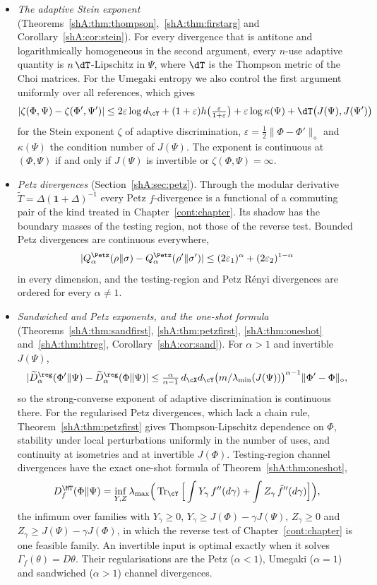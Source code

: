 \begin{itemize}[leftmargin=1.5em]
\item \emph{The adaptive Stein exponent} (Theorems~\ref{shA:thm:thompson},~\ref{shA:thm:firstarg} and Corollary~\ref{shA:cor:stein}). For every divergence that is antitone and logarithmically homogeneous in the second argument, every $n$-use adaptive quantity is $n\,\dT$-Lipschitz in $\Psi$, where $\dT$ is the Thompson metric of the Choi matrices. For the Umegaki entropy we also control the first argument uniformly over all references, which gives
\[
|\zeta(\Phi,\Psi)-\zeta(\Phi',\Psi')|\le 2\varepsilon\log d_\cY+(1+\varepsilon)h\big(\tfrac{\varepsilon}{1+\varepsilon}\big)+\varepsilon\log\kappa(\Psi)+\dT\big(J(\Psi),J(\Psi')\big)
\]
for the Stein exponent $\zeta$ of adaptive discrimination, $\varepsilon=\frac12\|\Phi-\Phi'\|_\diamond$ and $\kappa(\Psi)$ the condition number of $J(\Psi)$. The exponent is continuous at $(\Phi,\Psi)$ if and only if $J(\Psi)$ is invertible or $\zeta(\Phi,\Psi)=\infty$.
\item \emph{Petz divergences} (Section~\ref{shA:sec:petz}). Through the modular derivative $\widetilde T=\Delta(\mathbf 1+\Delta)^{-1}$ every Petz $f$-divergence is a functional of a commuting pair of the kind treated in Chapter~\ref{cont:chapter}. Its shadow has the boundary masses of the testing region, not those of the reverse test. Bounded Petz divergences are continuous everywhere,
\[
|Q^\Petz_\alpha(\rho\|\sigma)-Q^\Petz_\alpha(\rho'\|\sigma')|\le(2\varepsilon_1)^\alpha+(2\varepsilon_2)^{1-\alpha}
\]
in every dimension, and the testing-region and Petz R\'enyi divergences are ordered for every $\alpha\ne1$.
\item \emph{Sandwiched and Petz exponents, and the one-shot formula} (Theorems~\ref{shA:thm:sandfirst}, \ref{shA:thm:petzfirst}, \ref{shA:thm:oneshot} and~\ref{shA:thm:htreg}, Corollary~\ref{shA:cor:sand}). For $\alpha>1$ and invertible $J(\Psi)$,
\[
|\widetilde D^\reg_\alpha(\Phi'\|\Psi)-\widetilde D^\reg_\alpha(\Phi\|\Psi)|\le\tfrac{\alpha}{\alpha-1}\,d_\cX d_\cY\big(m/\lambda_{\min}(J(\Psi))\big)^{\alpha-1}\|\Phi'-\Phi\|_\diamond ,
\]
so the strong-converse exponent of adaptive discrimination is continuous there. For the regularised Petz divergences, which lack a chain rule, Theorem~\ref{shA:thm:petzfirst} gives Thompson-Lipschitz dependence on $\Phi$, stability under local perturbations uniformly in the number of uses, and continuity at isometries and at invertible $J(\Phi)$. Testing-region channel divergences have the exact one-shot formula of Theorem~\ref{shA:thm:oneshot},
\[
D^\HT_f(\Phi\|\Psi)=\inf_{Y,Z}\lambda_{\max}\Big(\Tr_\cY\Big[\int Y_\gamma\,f''(d\gamma)+\int Z_\gamma\,\tilde f''(d\gamma)\Big]\Big),
\]
the infimum over families with $Y_\gamma\ge0$, $Y_\gamma\ge J(\Phi)-\gamma J(\Psi)$, $Z_\gamma\ge0$ and $Z_\gamma\ge J(\Psi)-\gamma J(\Phi)$, in which the reverse test of Chapter~\ref{cont:chapter} is one feasible family. An invertible input is optimal exactly when it solves $\Gamma_f(\theta)=D\theta$. Their regularisations are the Petz ($\alpha<1$), Umegaki ($\alpha=1$) and sandwiched ($\alpha>1$) channel divergences.
\end{itemize}

